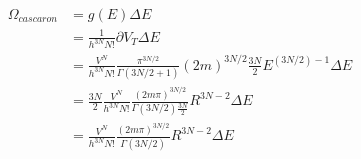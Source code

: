 \begin{answer}[literal b]
    \begin{align*}
        \Omega_{cascaron} &= g(E) \Delta E\\
        &= \frac{1}{h^{3N}N!}\partial V_T \Delta E\\
        &= \frac{V^N}{h^{3N}N!} \frac{\pi^{3N/2}}{\Gamma(3N/2 + 1)} (2m)^{3N/2} \frac{3N}{2} E^{(3N/2) - 1}\Delta E\\
        &= \frac{3N}{2}\frac{V^N}{h^{3N}N!} \frac{(2m\pi)^{3N/2}}{\Gamma(3N/2) \frac{3N}{2}} R^{3N-2}  \Delta E\\
        &= \frac{V^N}{h^{3N}N!} \frac{(2m\pi)^{3N/2}}{\Gamma(3N/2)} R^{3N-2}  \Delta E\\
    \end{align*}
\end{answer}    